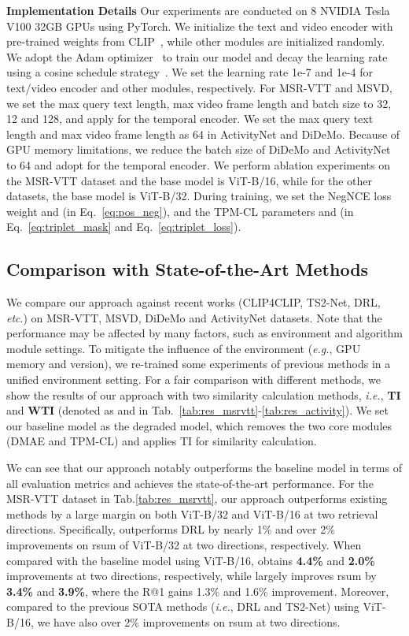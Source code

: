 \documentclass[sigconf]{acmart}
\begin{document}
\textbf{Implementation Details}
Our experiments are conducted on 8 NVIDIA Tesla V100 32GB GPUs using PyTorch. We initialize the text and video encoder with pre-trained weights from CLIP~\cite{clip2021}, while other modules are initialized randomly. We adopt the Adam optimizer~\cite{Kingma2014AdamAM} to train our model and decay the learning rate using a cosine schedule strategy~\cite{Loshchilov2016SGDRSG}. We set the learning rate  1e-7 and 1e-4 for text/video encoder and other modules, respectively. For MSR-VTT and MSVD, we set the max query text length, max video frame length and batch size to 32, 12 and 128, and apply  for the temporal encoder. We set the max query text length and max video frame length as 64 in ActivityNet and DiDeMo. Because of GPU memory limitations, we reduce the batch size of DiDeMo and ActivityNet to 64 and adopt  for the temporal encoder.
We perform ablation experiments on the MSR-VTT dataset and the base model is ViT-B/16, while for the other datasets, the base model is ViT-B/32.
During training, we set the NegNCE loss weight  and  (in Eq.~\ref{eq:pos_neg}), and the TPM-CL parameters  and (in Eq.~\ref{eq:triplet_mask} and Eq.~\ref{eq:triplet_loss}).

\vspace{-0.2cm}
\subsection{Comparison with State-of-the-Art Methods}
We compare our approach against recent works (CLIP4CLIP, TS2-Net, DRL, \textit{etc}.) on MSR-VTT, MSVD, DiDeMo and ActivityNet datasets. 
Note that the performance may be affected by many factors, such as environment and algorithm module settings.
To mitigate the influence of the environment (\textit{e.g.}, GPU memory and version), we re-trained some experiments of previous methods in a unified environment setting. 
For a fair comparison with different methods, we show the results of our approach with two similarity calculation methods, \emph{i.e.}, \textbf{TI} and \textbf{WTI} \cite{drl2022}(denoted as  and  in Tab.~\ref{tab:res_msrvtt}-\ref{tab:res_activity}).
We set our baseline model as the degraded model, which removes the two core modules (DMAE and TPM-CL) and applies TI for similarity calculation.


We can see that our approach notably outperforms the baseline model in terms of all evaluation metrics and achieves the state-of-the-art performance. For the MSR-VTT dataset in Tab.\ref{tab:res_msrvtt}, our approach outperforms existing methods by a large margin on both ViT-B/32 and ViT-B/16 at two retrieval directions. Specifically,  outperforms DRL by nearly 1\% and over 2\% improvements on rsum of ViT-B/32 at two directions, respectively.
When compared with the baseline model using ViT-B/16,  obtains \textbf{4.4\%} and \textbf{2.0\%} improvements at two directions, respectively, while  largely improves rsum by \textbf{3.4\%} and \textbf{3.9\%}, where the R@1 gains 1.3\% and 1.6\% improvement. Moreover, compared to the previous SOTA methods (\emph{i.e.}, DRL and TS2-Net) using ViT-B/16, we have also over 2\% improvements on rsum at two directions.
\end{document}
